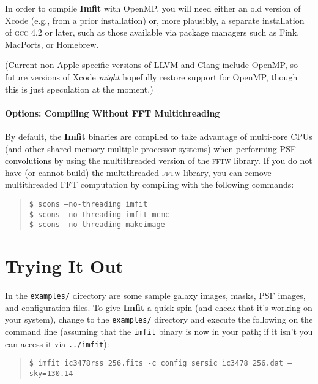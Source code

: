 \documentclass[10pt,a4paper,article]{memoir}
\newcommand{\imfit}{\textbf{Imfit}}
\newcommand{\Imfit}{\textbf{Imfit}}
\newcommand{\imfitprog}{\texttt{imfit}}
\begin{document}
In order to compile \imfit{} with OpenMP, you will need either an
old version of Xcode (e.g., from a prior installation) or, more plausibly, a
separate installation of \textsc{gcc} 4.2 or later, such as those
available via package managers such as Fink, MacPorts, or Homebrew.

(Current non-Apple-specific versions of LLVM and Clang include OpenMP, so
future versions of Xcode \textit{might} hopefully restore support for
OpenMP, though this is just speculation at the moment.)



\subsubsection{Options: Compiling Without FFT Multithreading}

By default, the \Imfit{} binaries are compiled to take advantage of multi-core CPUs (and other
shared-memory multiple-processor systems) when performing PSF convolutions by using the 
multithreaded version of the
\textsc{fftw} library. If you do not have (or cannot build) the multithreaded \textsc{fftw} library,
you can remove multithreaded FFT computation by compiling with the following commands:
\begin{quote}
\texttt{\$ scons --no-threading imfit} \\
\texttt{\$ scons --no-threading imfit-mcmc} \\
\texttt{\$ scons --no-threading makeimage}
\end{quote}





\newpage

\chapter{Trying It Out}

In the \texttt{examples/} directory are some sample galaxy images, masks, PSF images, and
configuration files. To give \imfit{} a quick spin (and check that it's working on your system), change to the
\texttt{examples/} directory and execute the following on the command line (assuming that
the \imfitprog{} binary is now in your path; if it isn't you can access it via
\texttt{../imfit}):
\begin{quote}
\texttt{\$ imfit ic3478rss\_256.fits \texttt{-c} config\_sersic\_ic3478\_256.dat \texttt{--}sky=130.14}
\end{quote}
\end{document}
